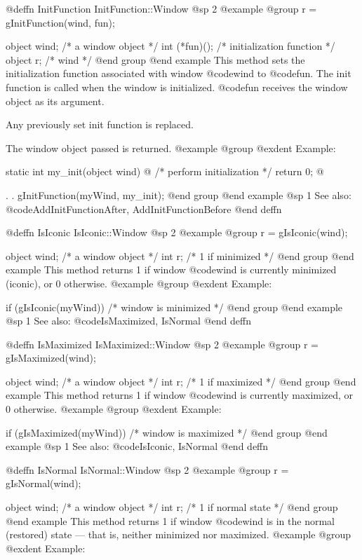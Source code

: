 @deffn {InitFunction} InitFunction::Window
@sp 2
@example
@group
r = gInitFunction(wind, fun);

object  wind;      /*  a window object         */
int    (*fun)();   /*  initialization function  */
object  r;         /*  wind                    */
@end group
@end example
This method sets the initialization function associated with window
@code{wind} to @code{fun}.  The init function is called when the
window is initialized.  @code{fun} receives the window object as
its argument.

Any previously set init function is replaced.

The window object passed is returned.
@example
@group
@exdent Example:

static  int  my_init(object wind)
@{
        /* perform initialization */
        return 0;
@}

        .
        .
        gInitFunction(myWind, my_init);
@end group
@end example
@sp 1
See also:  @code{AddInitFunctionAfter, AddInitFunctionBefore}
@end deffn




@deffn {IsIconic} IsIconic::Window
@sp 2
@example
@group
r = gIsIconic(wind);

object  wind;   /*  a window object  */
int     r;      /*  1 if minimized   */
@end group
@end example
This method returns 1 if window @code{wind} is currently minimized
(iconic), or 0 otherwise.
@example
@group
@exdent Example:

if (gIsIconic(myWind))
        /* window is minimized */
@end group
@end example
@sp 1
See also:  @code{IsMaximized, IsNormal}
@end deffn




@deffn {IsMaximized} IsMaximized::Window
@sp 2
@example
@group
r = gIsMaximized(wind);

object  wind;   /*  a window object  */
int     r;      /*  1 if maximized   */
@end group
@end example
This method returns 1 if window @code{wind} is currently maximized,
or 0 otherwise.
@example
@group
@exdent Example:

if (gIsMaximized(myWind))
        /* window is maximized */
@end group
@end example
@sp 1
See also:  @code{IsIconic, IsNormal}
@end deffn




@deffn {IsNormal} IsNormal::Window
@sp 2
@example
@group
r = gIsNormal(wind);

object  wind;   /*  a window object    */
int     r;      /*  1 if normal state  */
@end group
@end example
This method returns 1 if window @code{wind} is in the normal
(restored) state --- that is, neither minimized nor maximized.
@example
@group
@exdent Example:

